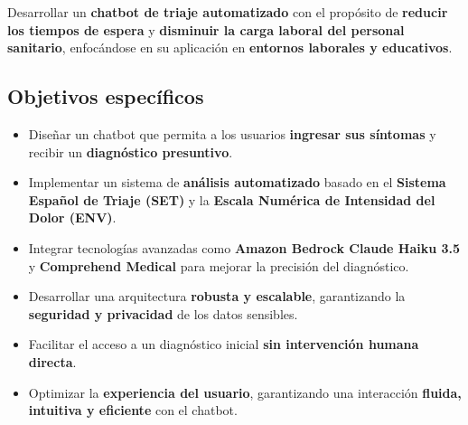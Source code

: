 Desarrollar un \textbf{chatbot de triaje automatizado} con el propósito de \textbf{reducir los tiempos de espera} y \textbf{disminuir la carga laboral del personal sanitario}, enfocándose en su aplicación en \textbf{entornos laborales y educativos}.  

\subsection{Objetivos específicos}  

\begin{itemize}
    \item Diseñar un chatbot que permita a los usuarios \textbf{ingresar sus síntomas} y recibir un \textbf{diagnóstico presuntivo}.  
    \item Implementar un sistema de \textbf{análisis automatizado} basado en el \textbf{Sistema Español de Triaje (SET)} y la \textbf{Escala Numérica de Intensidad del Dolor (ENV)}.  
    \item Integrar tecnologías avanzadas como \textbf{Amazon Bedrock Claude Haiku 3.5} y \textbf{Comprehend Medical} para mejorar la precisión del diagnóstico.  
    \item Desarrollar una arquitectura \textbf{robusta y escalable}, garantizando la \textbf{seguridad y privacidad} de los datos sensibles.  
    \item Facilitar el acceso a un diagnóstico inicial \textbf{sin intervención humana directa}.  
    \item Optimizar la \textbf{experiencia del usuario}, garantizando una interacción \textbf{fluida, intuitiva y eficiente} con el chatbot.  
\end{itemize}  